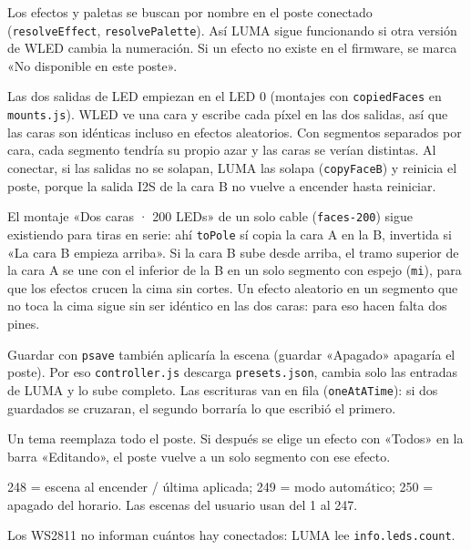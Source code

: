\begin{description}[leftmargin=0pt]
\item[Nombres, no números] Los efectos y paletas se buscan por nombre en el poste conectado (\texttt{resolveEffect}, \texttt{resolvePalette}). Así LUMA sigue funcionando si otra versión de WLED cambia la numeración. Si un efecto no existe en el firmware, se marca «No disponible en este poste».
\item[La cara B la copia el controlador] Las dos salidas de LED empiezan en el LED 0 (montajes con \texttt{copiedFaces} en \texttt{mounts.js}). WLED ve una cara y escribe cada píxel en las dos salidas, así que las caras son idénticas incluso en efectos aleatorios. Con segmentos separados por cara, cada segmento tendría su propio azar y las caras se verían distintas. Al conectar, si las salidas no se solapan, LUMA las solapa (\texttt{copyFaceB}) y reinicia el poste, porque la salida I2S de la cara B no vuelve a encender hasta reiniciar.
\item[Un solo cable de datos] El montaje «Dos caras · 200 LEDs» de un solo cable (\texttt{faces-200}) sigue existiendo para tiras en serie: ahí \texttt{toPole} sí copia la cara A en la B, invertida si «La cara B empieza arriba». Si la cara B sube desde arriba, el tramo superior de la cara A se une con el inferior de la B en un solo segmento con espejo (\texttt{mi}), para que los efectos crucen la cima sin cortes. Un efecto aleatorio en un segmento que no toca la cima sigue sin ser idéntico en las dos caras: para eso hacen falta dos pines.
\item[Presets subiendo el archivo] Guardar con \texttt{psave} también aplicaría la escena (guardar «Apagado» apagaría el poste). Por eso \texttt{controller.js} descarga \texttt{presets.json}, cambia solo las entradas de LUMA y lo sube completo. Las escrituras van en fila (\texttt{oneAtATime}): si dos guardados se cruzaran, el segundo borraría lo que escribió el primero.
\item[Temas] Un tema reemplaza todo el poste. Si después se elige un efecto con «Todos» en la barra «Editando», el poste vuelve a un solo segmento con ese efecto.
\item[Presets reservados] 248 = escena al encender / última aplicada; 249 = modo automático; 250 = apagado del horario. Las escenas del usuario usan del 1 al 247.
\item[La cantidad de LED la dice WLED] Los WS2811 no informan cuántos hay conectados: LUMA lee \texttt{info.leds.count}.
\end{description}
